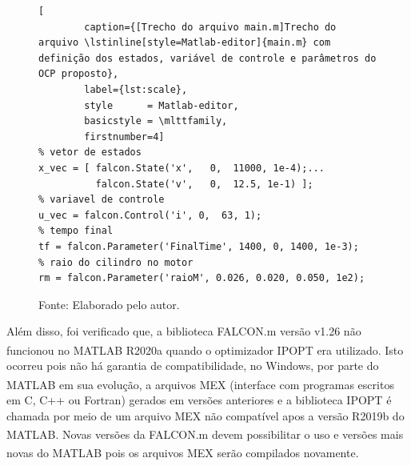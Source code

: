 \begin{figure}[h]
    \begin{lstlisting}[
        caption={[Trecho do arquivo main.m]Trecho do arquivo \lstinline[style=Matlab-editor]{main.m} com definição dos estados, variável de controle e parâmetros do OCP proposto}, 
        label={lst:scale},
        style      = Matlab-editor,
        basicstyle = \mlttfamily,
        firstnumber=4]
% vetor de estados
x_vec = [ falcon.State('x',   0,  11000, 1e-4);...
          falcon.State('v',   0,  12.5, 1e-1) ];
% variavel de controle
u_vec = falcon.Control('i', 0,  63, 1);
% tempo final
tf = falcon.Parameter('FinalTime', 1400, 0, 1400, 1e-3);
% raio do cilindro no motor
rm = falcon.Parameter('raioM', 0.026, 0.020, 0.050, 1e2);
    \end{lstlisting}
    \caption*{\footnotesize{Fonte: Elaborado pelo autor.}}
\end{figure}

Além disso, foi verificado que, a biblioteca FALCON.m versão v1.26 não funcionou no MATLAB\textsuperscript{\textregistered} R2020a quando o optimizador  IPOPT era utilizado.
Isto ocorreu pois não há garantia de compatibilidade, no Windows, por parte do MATLAB\textsuperscript{\textregistered} em sua evolução, a arquivos MEX (interface com programas escritos em C, C++ ou Fortran) gerados em versões 
anteriores e a biblioteca IPOPT é chamada por meio de um arquivo MEX não compatível apos a versão R2019b do MATLAB\textsuperscript{\textregistered}. Novas versões da FALCON.m
devem possibilitar o uso e versões mais novas do MATLAB\textsuperscript{\textregistered} pois os arquivos MEX serão compilados novamente.




\clearpage